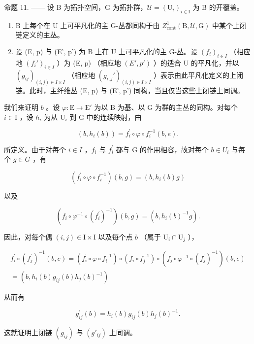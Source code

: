 命题 11. —— 设 B 为拓扑空间，G 为拓扑群，\(\mathcal{U} = (\mathrm{U}_{i})_{i\in \mathrm{I}}\) 为 B 的开覆盖。

\begin{enumerate}
\def\labelenumi{\alph{enumi})}
\item
  B 上每个在 U 上可平凡化的主 G-丛都同构于由 \(Z_{\mathrm{cont}}^{1}(\mathrm{B}, \mathcal{U}, \mathrm{G})\) 中某个上闭链定义的主丛。
\item
  设 (E, p) 与 (E', p') 为 B 上在 U 上可平凡化的主 G-丛。设 \((f_i)_{i \in I}\) （相应地 \((f_i')_{i \in I}\) ）为 (E, p) （相应地 \((E', p')\) ）的适合 U 的平凡化，并以 \((g_{ij})_{(i,j) \in I \times I}\) （相应地 \((g_{i,j}')_{(i,j) \in I \times I}\) ）表示由此平凡化定义的上闭链。此时，主纤维丛 (E, p) 与 (E', p') 同构，当且仅当这些上闭链上同调。
\end{enumerate}

我们来证明 \(b\) 。设 \(\varphi: \mathrm{E} \to \mathrm{E}'\) 为以 B 为基、以 G 为群的主丛的同构。对每个 \(i \in \mathrm{I}\) ，设 \(h_i\) 为从 \(\mathrm{U}_i\) 到 G 中的连续映射，由

\[
(b, h _ {i} (b)) = f _ {i} ^ {\prime} \circ \varphi \circ f _ {i} ^ {- 1} (b, e).
\]

所定义。由于对每个 \(i \in I\) ，\(f_{i}\) 与 \(f_{i}^{\prime}\) 都与 G 的作用相容，故对每个 \(b \in U_{i}\) 与每个 \(g \in G\) ，有

\[
(f _ {i} ^ {\prime} \circ \varphi \circ f _ {i} ^ {- 1}) (b, g) = (b, h _ {i} (b) g)
\]

以及

\[
(f _ {i} \circ \varphi^ {- 1} \circ (f _ {i} ^ {\prime}) ^ {- 1}) (b, g) = (b, h _ {i} (b) ^ {- 1} g).
\]

因此，对每个偶 \((i,j)\in \mathrm{I}\times \mathrm{I}\) 以及每个点 \(b\) （属于 \(\mathrm{U}_i\cap \mathrm{U}_j\) ），

\[
\begin{array}{c} f _ {i} ^ {\prime} \circ (f _ {j} ^ {\prime}) ^ {- 1} (b, e) = (f _ {i} ^ {\prime} \circ \varphi \circ f _ {i} ^ {- 1}) \circ (f _ {i} \circ f _ {j} ^ {- 1}) \circ (f _ {j} \circ \varphi^ {- 1} \circ (f _ {j} ^ {\prime}) ^ {- 1}) (b, e) \\ = (b, h _ {i} (b) g _ {i j} (b) h _ {j} (b) ^ {- 1}) \end{array}
\]

从而有

\[
g _ {i j} ^ {\prime} (b) = h _ {i} (b) g _ {i j} (b) h _ {j} (b) ^ {- 1}.
\]

这就证明上闭链 \((g_{ij})\) 与 \((g'_{ij})\) 上同调。

